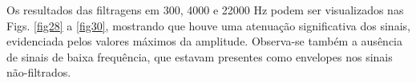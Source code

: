 






Os resultados das filtragens em 300, 4000 e 22000 Hz podem ser visualizados nas Figs. \ref{fig28} a \ref{fig30}, mostrando %
que houve uma atenuação significativa dos sinais, evidenciada pelos valores máximos da amplitude. Observa-se também a ausência de sinais de baixa frequência, que estavam presentes como envelopes nos sinais não-filtrados.



